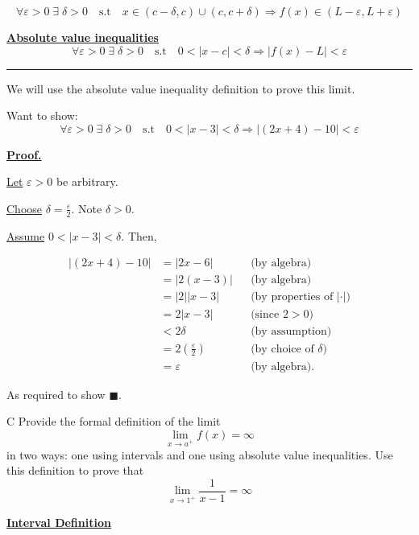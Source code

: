\documentclass[]{article}
\begin{document}
\[
    \forall \varepsilon > 0 \;\exists\;\delta > 0 \quad \text{s.t} \quad x \in(c - \delta, c)\cup(c, c+\delta)\Longrightarrow f(x) \in (L-\varepsilon, L+\varepsilon)
\]

\underline{\bf{Absolute value inequalities}}
\[
    \forall \varepsilon > 0\;\exists\; \delta>0 \quad \text{s.t} \quad 
    0 < |x-c| < \delta \Longrightarrow |f(x) - L|  < \varepsilon
\]

\hrule
\vspace{0.1in}
We will use the absolute value inequality definition to prove this limit.

Want to show: 
\[
    \forall \varepsilon > 0\;\exists\; \delta>0 \quad \text{s.t} \quad 
    0 < |x-3| < \delta \Longrightarrow |(2x +4) - 10|  < \varepsilon
\]

\underline{\bf{Proof.}}

\underline{Let} $\varepsilon > 0$ be arbitrary.

\medbreak

\underline{Choose} $\delta = \frac{\varepsilon}{2}$. Note $\delta > 0$.

\medbreak

\underline{Assume} $0 < |x-3| < \delta$. Then, 

\begin{align*}
    |(2x + 4) -10| &= |2x-6| 
        && \text{(by algebra)} \\[6pt]
    &= |2(x-3)| 
        && \text{(by algebra)} \\[6pt]
    &= |2||x-3| 
        && \text{(by properties of $|\cdot|$)} \\[6pt]
    &= 2|x-3| 
        && \text{(since $2>0$)} \\[6pt]
    &< 2\delta 
        && \text{(by assumption)} \\[6pt]
    &= 2\!\left(\tfrac{\varepsilon}{2}\right) 
        && \text{(by choice of $\delta$)} \\[6pt]
    &= \varepsilon 
        && \text{(by algebra).}
\end{align*}

As required to show $\blacksquare$.
\begin{question}{C}
    Provide the formal definition of the limit
    \[
    \lim_{x \to a^+} f(x) = \infty
    \]
    in two ways: one using intervals and one using absolute value inequalities. Use this definition to prove that
    \[
    \lim_{x \to 1^+} \frac{1}{x-1} = \infty
    \]
\end{question}


\underline{\bf{Interval Definition}}
\end{document}
